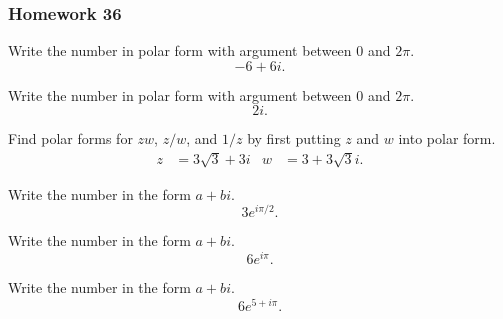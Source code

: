 \subsubsection{Homework 36}
\begin{problem}[WebAssign HW 36, \# 1]
Write the number in polar form with argument between $0$ and $2\pi$.
\[
-6+6i.
\]
\end{problem}
\begin{problem}[WebAssign HW 36, \# 2]
Write the number in polar form with argument between $0$ and $2\pi$.
\[
2i.
\]
\end{problem}
\begin{problem}[WebAssign HW 36, \# 3]
Find polar forms for $zw$, $z/w$, and $1/z$ by first putting $z$ and $w$
into polar form.
\[
\begin{aligned}
z&=3\sqrt{3}+3i&
w&=3+3\sqrt{3}i.
\end{aligned}
\]
\end{problem}
\begin{problem}[WebAssign HW 36, \# 4]
Write the number in the form $a+bi$.
\[
3e^{i\pi/2}.
\]
\end{problem}
\begin{problem}[WebAssign HW 36, \# 5]
Write the number in the form $a+bi$.
\[
6e^{i\pi}.
\]
\end{problem}
\begin{problem}[WebAssign HW 36, \# 6]
Write the number in the form $a+bi$.
\[
6e^{5+i\pi}.
\]
\end{problem}



